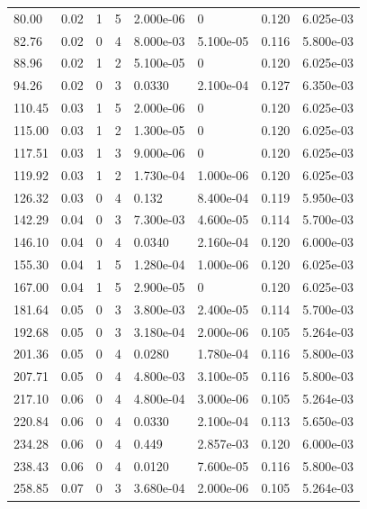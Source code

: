 \documentclass[preview]{standalone}
\begin{document}
{{\begin{tabular}{L{1.2cm}C{1.2cm} C{0.3cm}C{0.5cm} C{1.4cm}C{1.4cm} C{1.4cm}C{1.4cm}}
  80.00  &  0.02  & 1     &  5 &  2.000e-06  & 0  & 0.120 &  6.025e-03   \\ 
  82.76  &  0.02  & 0     &  4 &  8.000e-03  & 5.100e-05  & 0.116 &  5.800e-03   \\ 
  88.96  &  0.02  & 1     &  2 &  5.100e-05  & 0  & 0.120 &  6.025e-03   \\ 
  94.26  &  0.02  & 0     &  3 &  0.0330  & 2.100e-04  & 0.127 &  6.350e-03   \\ 
  110.45  &  0.03  & 1     &  5 &  2.000e-06  & 0  & 0.120 &  6.025e-03   \\ 
  115.00  &  0.03  & 1     &  2 &  1.300e-05  & 0  & 0.120 &  6.025e-03   \\ 
  117.51  &  0.03  & 1     &  3 &  9.000e-06  & 0  & 0.120 &  6.025e-03   \\ 
  119.92  &  0.03  & 1     &  2 &  1.730e-04  & 1.000e-06  & 0.120 &  6.025e-03   \\ 
  126.32  &  0.03  & 0     &  4 &  0.132  & 8.400e-04  & 0.119 &  5.950e-03   \\ 
  142.29  &  0.04  & 0     &  3 &  7.300e-03  & 4.600e-05  & 0.114 &  5.700e-03   \\ 
  146.10  &  0.04  & 0     &  4 &  0.0340  & 2.160e-04  & 0.120 &  6.000e-03   \\ 
  155.30  &  0.04  & 1     &  5 &  1.280e-04  & 1.000e-06  & 0.120 &  6.025e-03   \\ 
  167.00  &  0.04  & 1     &  5 &  2.900e-05  & 0  & 0.120 &  6.025e-03   \\ 
  181.64  &  0.05  & 0     &  3 &  3.800e-03  & 2.400e-05  & 0.114 &  5.700e-03   \\ 
  192.68  &  0.05  & 0     &  3 &  3.180e-04  & 2.000e-06  & 0.105 &  5.264e-03   \\ 
  201.36  &  0.05  & 0     &  4 &  0.0280  & 1.780e-04  & 0.116 &  5.800e-03   \\ 
  207.71  &  0.05  & 0     &  4 &  4.800e-03  & 3.100e-05  & 0.116 &  5.800e-03   \\ 
  217.10  &  0.06  & 0     &  4 &  4.800e-04  & 3.000e-06  & 0.105 &  5.264e-03   \\ 
  220.84  &  0.06  & 0     &  4 &  0.0330  & 2.100e-04  & 0.113 &  5.650e-03   \\ 
  234.28  &  0.06  & 0     &  4 &  0.449  & 2.857e-03  & 0.120 &  6.000e-03   \\ 
  238.43  &  0.06  & 0     &  4 &  0.0120  & 7.600e-05  & 0.116 &  5.800e-03   \\ 
  258.85  &  0.07  & 0     &  3 &  3.680e-04  & 2.000e-06  & 0.105 &  5.264e-03   \\ 

\end{tabular}}}
\end{document}
